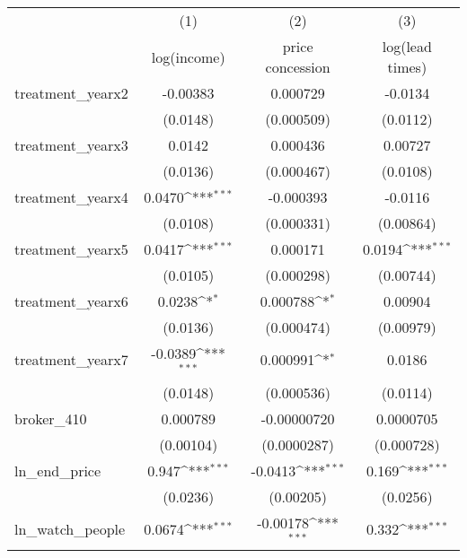 {
\def\sym#1{\ifmmode^{#1}\else\(^{#1}\)\fi}
\begin{tabular}{l*{3}{c}}
\toprule
            &\multicolumn{1}{c}{(1)}&\multicolumn{1}{c}{(2)}&\multicolumn{1}{c}{(3)}\\
            &\multicolumn{1}{c}{log(income)}&\multicolumn{1}{c}{price concession}&\multicolumn{1}{c}{log(lead times)}\\
\midrule
treatment\_yearx2&    -0.00383         &    0.000729         &     -0.0134         \\
            &    (0.0148)         &  (0.000509)         &    (0.0112)         \\
\addlinespace
treatment\_yearx3&      0.0142         &    0.000436         &     0.00727         \\
            &    (0.0136)         &  (0.000467)         &    (0.0108)         \\
\addlinespace
treatment\_yearx4&      0.0470\sym{***}&   -0.000393         &     -0.0116         \\
            &    (0.0108)         &  (0.000331)         &   (0.00864)         \\
\addlinespace
treatment\_yearx5&      0.0417\sym{***}&    0.000171         &      0.0194\sym{***}\\
            &    (0.0105)         &  (0.000298)         &   (0.00744)         \\
\addlinespace
treatment\_yearx6&      0.0238\sym{*}  &    0.000788\sym{*}  &     0.00904         \\
            &    (0.0136)         &  (0.000474)         &   (0.00979)         \\
\addlinespace
treatment\_yearx7&     -0.0389\sym{***}&    0.000991\sym{*}  &      0.0186         \\
            &    (0.0148)         &  (0.000536)         &    (0.0114)         \\
\addlinespace
broker\_410  &    0.000789         & -0.00000720         &   0.0000705         \\
            &   (0.00104)         & (0.0000287)         &  (0.000728)         \\
\addlinespace
ln\_end\_price&       0.947\sym{***}&     -0.0413\sym{***}&       0.169\sym{***}\\
            &    (0.0236)         &   (0.00205)         &    (0.0256)         \\
\addlinespace
ln\_watch\_people&      0.0674\sym{***}&    -0.00178\sym{***}&       0.332\sym{***}\\

\end{tabular}}
